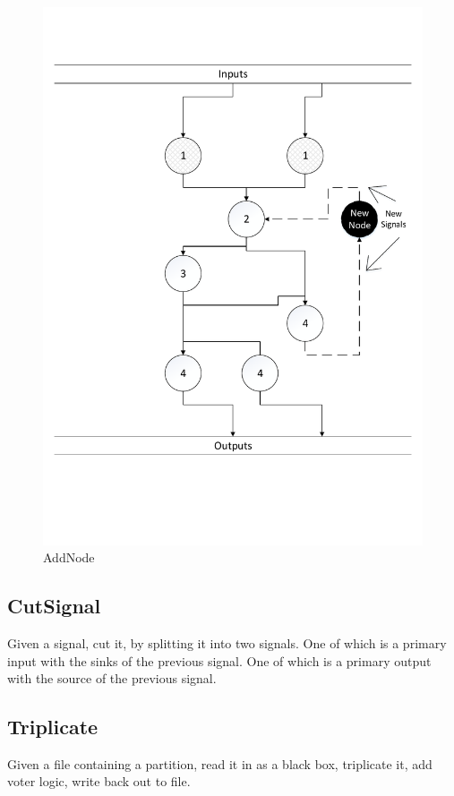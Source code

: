 \documentclass[12pt,final,oneside]{dwThesis} %
\begin{document}
   \begin{figure}
      \begin{center}
         \includegraphics[width=\linewidth]{images/UpdateCostsAndBreakCycles.pdf}
         \caption{AddNode}
         \label{imAddnode}
      \end{center}
   \end{figure}

   \newpage
   \subsection{CutSignal}\label{cutsignal}
   Given a signal, cut it, by splitting it into two signals. One of which is a primary input with the sinks of the previous signal. One of which is a primary output with the source of the previous signal.

   \newpage
   \subsection{Triplicate}\label{algTriplicate}
   Given a file containing a partition, read it in as a black box, triplicate it, add voter logic, write back out to file.
\end{document}
